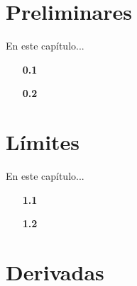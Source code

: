 \documentclass[justified,twoside,symmetric,explicit,letterpaper]{tufte-book} %
\numberwithin{figure}{chapter}
\begin{document}
\renewcommand\chapterillustration{cover0}
\renewcommand\chapterwatermark{logo0}
\chapter{Preliminares}

\par En este cap\'itulo...


\begin{enumerate}[itemsep=2pt, leftmargin=10pt,itemindent=10pt]
    \item[\textbf{0.1}] 
    \item[\textbf{0.2}] 
\end{enumerate}


\label{ch:unidad0}
\clearpage




\mainmatter
\graphicspath{{./ImagesMain/}} 
\setcounter{chapter}{0}

\renewcommand\chapterillustration{cover1}
\renewcommand\chapterwatermark{logo1}
\chapter{L\'imites}

\par En este cap\'itulo...


\begin{enumerate}[itemsep=2pt, leftmargin=10pt,itemindent=10pt]
    \item[\textbf{1.1}] 
    \item[\textbf{1.2}] 
    \end{enumerate}


\label{ch:unidad1}
\clearpage




\mainmatter
\graphicspath{{./ImagesMain/}} 
\setcounter{chapter}{1}

\renewcommand\chapterillustration{cover2}
\renewcommand\chapterwatermark{logo2}
\chapter{Derivadas}
\end{document}
